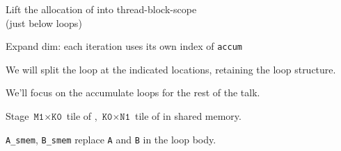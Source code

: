 {\LARGE
Lift the allocation of  into thread-block-scope\\
(just below  loops)
}

\newpage
{}

{\large

}

{\LARGE
Expand dim: each iteration uses its own index of \texttt{accum}
}

\newpage
{}

{\large

}

{\LARGE
We will split the loop at the indicated locations, retaining the loop structure.
}

\newpage

{\large

}

\newpage
{}

{\large

}

{\LARGE
We'll focus on the accumulate loops for the rest of the talk.

}

\newpage
{}

{\large

}


\begin{center}
\Large
\begin{tikzpicture}[node distance=0mm]

\end{tikzpicture}
\end{center}

\newpage
{}

{\large

}

{\LARGE
Stage $\texttt{M1} \times \texttt{K0}$ tile of , $\texttt{K0} \times \texttt{N1}$ tile of  in shared memory.

\texttt{A\_smem}, \texttt{B\_smem} replace \texttt{A} and \texttt{B} in the loop body.

}

\newpage
{}

{\large

}

